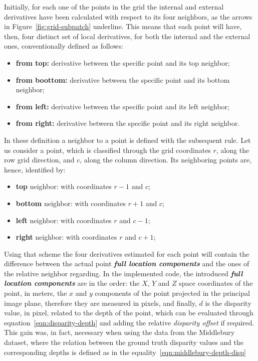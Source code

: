 Initially, for each one of the points in the grid the internal and external derivatives have been calculated with respect to its four neighbors, as the arrows in Figure~\ref{fig:grid-subpatch} underline. 
This means that each point will have, then, four distinct set of local derivatives, for both the internal and the external ones, conventionally defined as follows:
\begin{itemize}
	\item \textbf{from top:} derivative between the specific point and its top neighbor;
	\item \textbf{from boottom:} derivative between the specific point and its bottom neighbor;
	\item \textbf{from left:} derivative between the specific point and its left neighbor;
	\item \textbf{from right:} derivative between the specific point and its right neighbor.
\end{itemize}
In these definition a neighbor to a point is defined with the subsequent rule. 
Let us consider a point, which is classified through the grid coordinates $r$, along the row grid direction, and  $c$, along the column direction. 
Its neighboring points are, hence, identified by:
\begin{itemize}
	\item \textbf{top} neighbor: with coordinates $r - 1$ and $c$;
	\item \textbf{bottom} neighbor: with coordinates $r + 1$ and $c$;
	\item \textbf{left} neighbor: with coordinates $r$ and $c - 1$;
	\item \textbf{right} neighbor: with coordinates $r$ and $c + 1$;
\end{itemize}
Using that scheme the four derivatives estimated for each point will contain the difference between the actual point  \textbf{\textit{full location components}} and the ones of the relative neighbor regarding.
In the implemented code, the introduced \textbf{\textit{full location components}} are in the order: the $X$, $Y$ and $Z$ space coordinates of the point, in meters, the $x$ and $y$ components of the point projected in the principal image plane, therefore they are measured in pixels, and finally, $d$ is the disparity value, in pixel, related to the depth of the point, which can be evaluated through equation~\ref{eqn:disparity-depth} and adding the relative \textit{disparity offset} if required.
This gain was, in fact, necessary when using the data from the Middlebury dataset, where the relation between the ground truth disparity values and the corresponding depths is defined as in the equality~\ref{eqn:middlebury-depth-disp}
